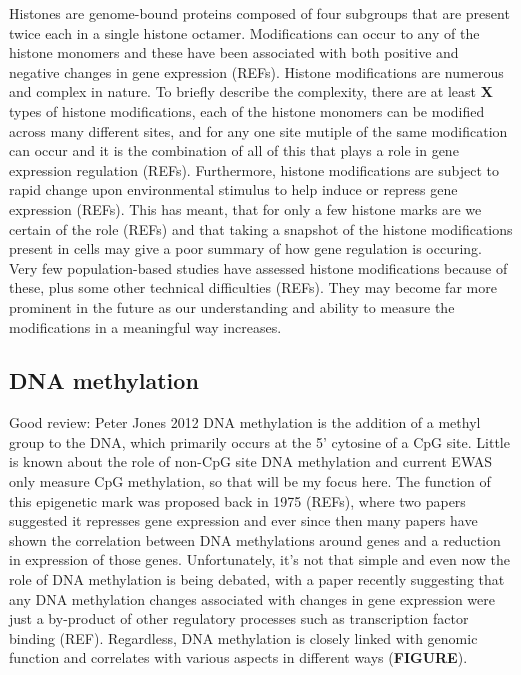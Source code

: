 \documentclass[11pt,twoside]{bristolthesis}
\begin{document}
Histones are genome-bound proteins composed of four subgroups that are present twice each in a single histone octamer. Modifications can occur to any of the histone monomers and these have been associated with both positive and negative changes in gene expression (REFs). Histone modifications are numerous and complex in nature. To briefly describe the complexity, there are at least \textbf{X} types of histone modifications, each of the histone monomers can be modified across many different sites, and for any one site mutiple of the same modification can occur and it is the combination of all of this that plays a role in gene expression regulation (REFs). Furthermore, histone modifications are subject to rapid change upon environmental stimulus to help induce or repress gene expression (REFs). This has meant, that for only a few histone marks are we certain of the role (REFs) and that taking a snapshot of the histone modifications present in cells may give a poor summary of how gene regulation is occuring. Very few population-based studies have assessed histone modifications because of these, plus some other technical difficulties (REFs). They may become far more prominent in the future as our understanding and ability to measure the modifications in a meaningful way increases.

\hypertarget{dna-methylation}{%
\subsection{DNA methylation}\label{dna-methylation}}

Good review: Peter Jones 2012
DNA methylation is the addition of a methyl group to the DNA, which primarily occurs at the 5' cytosine of a CpG site. Little is known about the role of non-CpG site DNA methylation and current EWAS only measure CpG methylation, so that will be my focus here. The function of this epigenetic mark was proposed back in 1975 (REFs), where two papers suggested it represses gene expression and ever since then many papers have shown the correlation between DNA methylations around genes and a reduction in expression of those genes. Unfortunately, it's not that simple and even now the role of DNA methylation is being debated, with a paper recently suggesting that any DNA methylation changes associated with changes in gene expression were just a by-product of other regulatory processes such as transcription factor binding (REF). Regardless, DNA methylation is closely linked with genomic function and correlates with various aspects in different ways (\textbf{FIGURE}).
\end{document}
